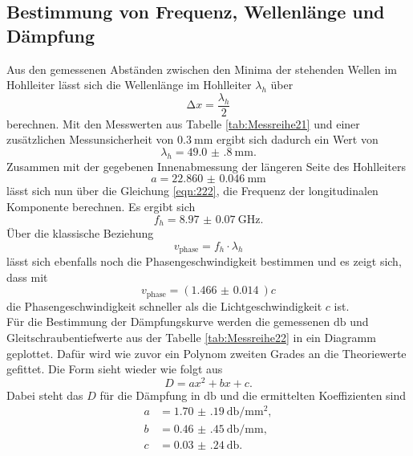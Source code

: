 \subsection{Bestimmung von Frequenz, Wellenlänge und Dämpfung}
Aus den gemessenen Abständen zwischen den Minima der stehenden Wellen im Hohlleiter lässt sich die Wellenlänge im Hohlleiter $\lambda_h$ über
\begin{equation*}
\increment x = \frac{\lambda_h}{2}
\end{equation*}
berechnen. Mit den Messwerten aus Tabelle \ref{tab:Messreihe21} und einer zusätzlichen Messunsicherheit von $\SI{0.3}{\milli\meter}$ ergibt sich dadurch ein Wert von
\begin{equation*}
\lambda_h = \SI{49.0(8)}{\milli\meter}.
\end{equation*}
Zusammen mit der gegebenen Innenabmessung der längeren Seite des Hohlleiters
\begin{equation*}
a = \SI{22.860(46)}{\milli\meter}
\end{equation*}
lässt sich nun über die Gleichung \ref{eqn:222}, die Frequenz der longitudinalen Komponente berechnen.
Es ergibt sich 
\begin{equation*}
f_h = \SI{8.97(7)}{\giga\hertz}.
\end{equation*}
Über die klassische Beziehung 
\begin{equation*}
v_{\text{phase}} = f_h \cdot \lambda_h
\end{equation*}
lässt sich ebenfalls noch die Phasengeschwindigkeit bestimmen und es zeigt sich, dass mit 
\begin{equation*}
v_{\text{phase}} = \left(\SI{1.466(14)}{}\right) c
\end{equation*}
die Phasengeschwindigkeit schneller als die Lichtgeschwindigkeit $c$ ist. 
\\
\newline
Für die Bestimmung der Dämpfungskurve werden die gemessenen $\si{\decibel}$ und Gleitschraubentiefwerte aus der Tabelle \ref{tab:Messreihe22} in ein Diagramm geplottet.
Dafür wird wie zuvor ein Polynom zweiten Grades an die Theoriewerte gefittet. Die Form sieht wieder wie folgt aus
\begin{equation*}
D = ax^2 + bx + c.
\end{equation*}
Dabei steht das $D$ für die Dämpfung in $\si{\decibel}$ und die ermittelten Koeffizienten sind
\begin{align*}
a &= \SI{1.70(19)}{\decibel\per\milli\meter\squared}, \\
b &= \SI{0.46(45)}{\decibel\per\milli\meter}, \\
c &= \SI{0.03(24)}{\decibel}.
\end{align*}
